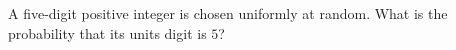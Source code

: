 A five-digit positive integer is chosen uniformly at random. What is the probability that its units digit is $5$?
